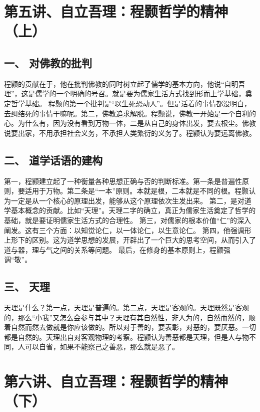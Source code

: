 \documentclass{article}
\begin{document}
\section{第五讲、自立吾理：程颢哲学的精神（上）}
\subsection{一、	对佛教的批判}
程颢的贡献在于，他在批判佛教的同时树立起了儒学的基本方向，他说“自明吾理”，这是儒学的一个明确的号召。就是要为儒家生活方式找到形而上学基础，奠定哲学基础。
程颢的第一个批判是“以生死恐动人”。但是活着的事情都没明白，去纠结死的事情干嘛呢。第二，佛教追求解脱。程颢说，佛教一开始是一个自利的心。为什么有，因为没有看到万物一体，二是从自己的身体出发，要去根尘。佛教说要出家，不用承担社会义务，不承担人类繁衍的义务了。程颢认为要远离佛教。
\subsection{二、	道学话语的建构}
第一，程颢建立起了一种衡量各种思想正确与否的判断标准。第一条是普遍性原则，要适用于万物。第二条是“一本”原则。本就是根，二本就是不同的根。程颢认为一定是从一个核心的原理出发，能够从这个原理依次生发出来。
第二，是对道学基本概念的贡献。比如“天理”。天理二字的确立，真正为儒家生活奠定了哲学的基础，就是要证明儒家生活方式的合理性。
第三，对儒家的根本价值“仁”的深入阐发。这有三个方面：以知觉论仁，以一体论仁，以生意论仁。
第四，他强调形上形下的区别。这为道学思想的发展，开辟出了一个巨大的思考空间，从而引入了道与器，理与气之间的关系等问题。
最后，在修身的基本原则上，程颢强调“敬”。
\subsection{三、	天理}
天理是什么？第一点，天理是普遍的。第二点，天理是客观的。天理既然是客观的，那么“小我”又怎么会参与其中？天理有其自然性，非人为的，自然而然的，顺着自然而然去做就是你应该做的。所以对于善的，要表彰，对恶的，要厌恶。一切都是自然的。天理出自对客观物理的考察。程颢认为善恶都是天理，但是人与物不同，人可以自省，如果不能察己之善恶，那么就是恶了。

\section{第六讲、自立吾理：程颢哲学的精神（下）}
\end{document}
